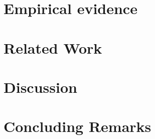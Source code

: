 \documentclass[10pt,conference,compsocconf]{IEEEtran}
\begin{document}
\section{Empirical evidence}
\label{sec:empirical}


\section{Related Work}
\label{sec:related_work}

\section{Discussion}
\label{sec:discussion}


\section{Concluding Remarks}
\label{sec:conclusions}



\newpage
\balance


\end{document}
